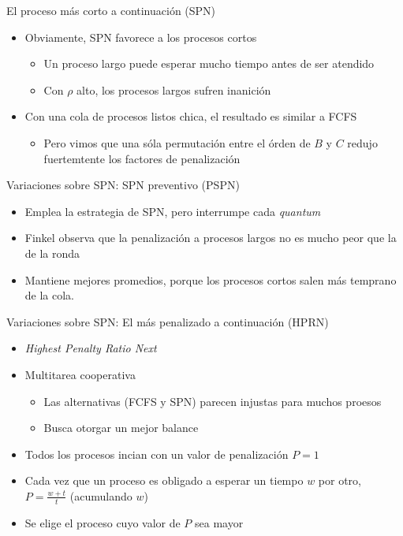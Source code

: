 \documentclass[presentation]{beamer}
\begin{document}
\begin{frame}[label={sec:orgfb15674}]{El proceso más corto a continuación (SPN)}
\begin{itemize}
\item Obviamente, SPN favorece a los procesos cortos
\begin{itemize}
\item Un proceso largo puede esperar mucho tiempo antes de ser atendido
\item Con \(\rho\) alto, los procesos largos sufren inanición
\end{itemize}
\item Con una cola de procesos listos chica, el resultado es similar a
FCFS
\begin{itemize}
\item Pero vimos que una sóla permutación entre el órden de \(B\) y \(C\)
redujo fuertemtente los factores de penalización
\end{itemize}
\end{itemize}
\end{frame}

\begin{frame}[label={sec:orgf71f9a7}]{Variaciones sobre SPN: SPN preventivo (PSPN)}
\begin{itemize}
\item Emplea la estrategia de SPN, pero interrumpe cada \emph{quantum}
\item Finkel observa que la penalización a procesos largos no es mucho
peor que la de la ronda
\item Mantiene mejores promedios, porque los procesos cortos salen más
temprano de la cola.
\end{itemize}
\end{frame}

\begin{frame}[label={sec:org6e66bbf}]{Variaciones sobre SPN: El más penalizado a continuación (HPRN)}
\begin{itemize}
\item \emph{Highest Penalty Ratio Next}
\item Multitarea cooperativa
\begin{itemize}
\item Las alternativas (FCFS y SPN) parecen injustas para muchos proesos
\item Busca otorgar un mejor balance
\end{itemize}
\item Todos los procesos incian con un valor de penalización \(P = 1\)
\item Cada vez que un proceso es obligado a esperar un tiempo \(w\) por
otro, \(P = \frac{w+t}{t}\) (acumulando \(w\))
\item Se elige el proceso cuyo valor de \(P\) sea mayor
\end{itemize}
\end{frame}
\end{document}
